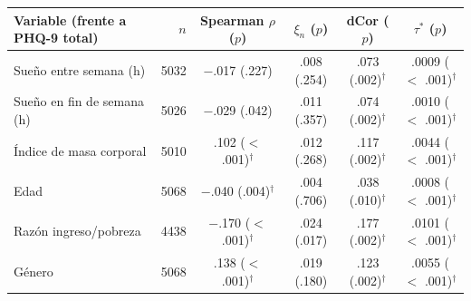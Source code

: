 \begin{tabular}{lrcccc}
\toprule
Variable (frente a PHQ-9 total) & $n$ & Spearman $\rho$ ($p$) & $\xi_n$ ($p$) & dCor ($p$) & $\tau^*$ ($p$) \\
\midrule
Sue\~no entre semana (h) & 5032 & $-$.017 (.227) & .008 (.254) & .073 (.002)$^{\dagger}$ & .0009 ($<$ .001)$^{\dagger}$ \\
Sue\~no en fin de semana (h) & 5026 & $-$.029 (.042) & .011 (.357) & .074 (.002)$^{\dagger}$ & .0010 ($<$ .001)$^{\dagger}$ \\
\'Indice de masa corporal & 5010 & .102 ($<$ .001)$^{\dagger}$ & .012 (.268) & .117 (.002)$^{\dagger}$ & .0044 ($<$ .001)$^{\dagger}$ \\
Edad & 5068 & $-$.040 (.004)$^{\dagger}$ & .004 (.706) & .038 (.010)$^{\dagger}$ & .0008 ($<$ .001)$^{\dagger}$ \\
Raz\'on ingreso/pobreza & 4438 & $-$.170 ($<$ .001)$^{\dagger}$ & .024 (.017) & .177 (.002)$^{\dagger}$ & .0101 ($<$ .001)$^{\dagger}$ \\
G\'enero & 5068 & .138 ($<$ .001)$^{\dagger}$ & .019 (.180) & .123 (.002)$^{\dagger}$ & .0055 ($<$ .001)$^{\dagger}$ \\
\bottomrule
\end{tabular}
